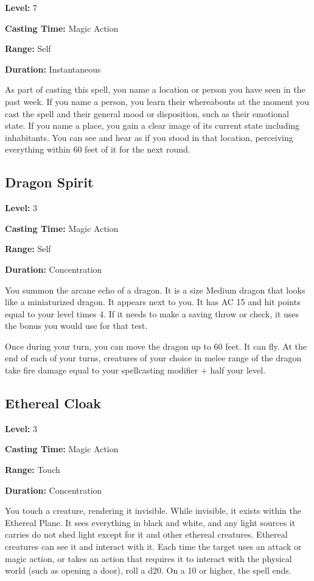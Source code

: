 \documentclass[12pt,letterpaper,twocolumn,openany,nodeprecatedcode,bg=none]{dndbook}
\begin{document}
\textbf{Level:} 7

\textbf{Casting Time:} Magic Action

\textbf{Range:} Self

\textbf{Duration:} Instantaneous

As part of casting this spell, you name a location or person you have
seen in the past week. If you name a person, you learn their whereabouts
at the moment you cast the spell and their general mood or disposition,
such as their emotional state. If you name a place, you gain a clear
image of its current state including inhabitants. You can see and hear
as if you stood in that location, perceiving everything within 60 feet
of it for the next round.

\subsection{Dragon Spirit}\label{dragon-spirit}

\textbf{Level:} 3

\textbf{Casting Time:} Magic Action

\textbf{Range:} Self

\textbf{Duration:} Concentration

You summon the arcane echo of a dragon. It is a size Medium dragon that
looks like a miniaturized dragon. It appears next to you. It has AC 15
and hit points equal to your level times 4. If it needs to make a saving
throw or check, it uses the bonus you would use for that test.

Once during your turn, you can move the dragon up to 60 feet. It can
fly. At the end of each of your turns, creatures of your choice in melee
range of the dragon take fire damage equal to your spellcasting modifier
+ half your level.

\subsection{Ethereal Cloak}\label{ethereal-cloak}

\textbf{Level:} 3

\textbf{Casting Time:} Magic Action

\textbf{Range:} Touch

\textbf{Duration:} Concentration

You touch a creature, rendering it invisible. While invisible, it exists
within the Ethereal Plane. It sees everything in black and white, and
any light sources it carries do not shed light except for it and other
ethereal creatures. Ethereal creatures can see it and interact with it.
Each time the target uses an attack or magic action, or takes an action
that requires it to interact with the physical world (such as opening a
door), roll a d20. On a 10 or higher, the spell ends.
\end{document}
